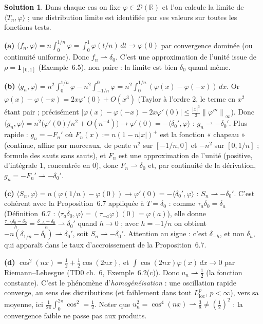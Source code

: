 \documentclass[11pt,a4paper]{article}
\newcommand{\R}{\mathbb{R}}
\newcommand{\norm}[1]{\left\|#1\right\|}
\newcommand{\wk}{\rightharpoonup}
\newcommand{\D}{\mathcal{D}}
\theoremstyle{definition}
\newtheorem*{solution}{Solution}
\begin{document}
\begin{solution}
Dans chaque cas on fixe $\varphi\in\D(\R)$ et l'on calcule la limite de $\langle T_n,\varphi\rangle$ ; une distribution limite est identifiée par ses valeurs sur toutes les fonctions tests.

\medskip
\noindent\textbf{(a)} $\langle f_n,\varphi\rangle=n\int_0^{1/n}\varphi=\int_0^1\varphi(t/n)\,dt\to\varphi(0)$ par convergence dominée (ou continuité uniforme). Donc $f_n\wk\delta_0$. C'est une approximation de l'unité issue de $\rho=\mathbf 1_{[0,1]}$ (Exemple~6.5), non paire : la limite est bien $\delta_0$ quand même.

\medskip
\noindent\textbf{(b)} $\langle g_n,\varphi\rangle=n^2\int_0^{1/n}\varphi-n^2\int_{-1/n}^0\varphi=n^2\int_0^{1/n}(\varphi(x)-\varphi(-x))\,dx$. Or $\varphi(x)-\varphi(-x)=2x\varphi'(0)+O(x^3)$ (Taylor à l'ordre $2$, le terme en $x^2$ étant pair ; précisément $|\varphi(x)-\varphi(-x)-2x\varphi'(0)|\le\frac{|x|^3}3\norm{\varphi'''}_\infty$). Donc $\langle g_n,\varphi\rangle=n^2\big(\varphi'(0)/n^2+O(n^{-4})\big)\to\varphi'(0)=-\langle\delta_0',\varphi\rangle$ : $g_n\wk-\delta_0'$. Plus rapide : $g_n=-F_n'$ où $F_n(x):=n(1-n|x|)^+$ est la fonction « chapeau » (continue, affine par morceaux, de pente $n^2$ sur $[-1/n,0]$ et $-n^2$ sur $[0,1/n]$ ; formule des sauts sans sauts), et $F_n$ est une approximation de l'unité (positive, d'intégrale $1$, concentrée en $0$), donc $F_n\wk\delta_0$ et, par continuité de la dérivation, $g_n=-F_n'\wk-\delta_0'$.

\medskip
\noindent\textbf{(c)} $\langle S_n,\varphi\rangle=n(\varphi(1/n)-\varphi(0))\to\varphi'(0)=-\langle\delta_0',\varphi\rangle$ : $S_n\wk-\delta_0'$. C'est cohérent avec la Proposition~6.7 appliquée à $T=\delta_0$ : comme $\tau_a\delta_0=\delta_a$ (Définition~6.7 : $\langle\tau_a\delta_0,\varphi\rangle=(\tau_{-a}\varphi)(0)=\varphi(a)$), elle donne $\frac{\tau_{-h}\delta_0-\delta_0}h=\frac{\delta_{-h}-\delta_0}h\wk\delta_0'$ quand $h\to0$ ; avec $h=-1/n$ on obtient $-n(\delta_{1/n}-\delta_0)\wk\delta_0'$, soit $S_n\wk-\delta_0'$. Attention au signe : c'est $\delta_{-h}$, et non $\delta_h$, qui apparaît dans le taux d'accroissement de la Proposition~6.7.

\medskip
\noindent\textbf{(d)} $\cos^2(nx)=\frac12+\frac12\cos(2nx)$, et $\int\cos(2nx)\varphi(x)\,dx\to0$ par Riemann--Lebesgue (TD0 ch.~6, Exemple~6.2(c)). Donc $u_n\wk\frac12$ (la fonction constante). C'est le phénomène d'\emph{homogénéisation} : une oscillation rapide converge, au sens des distributions (et faiblement dans tout $L^p_{\mathrm{loc}}$, $p<\infty$), vers sa moyenne, ici $\frac1{2\pi}\int_0^{2\pi}\cos^2=\frac12$. Noter que $u_n^2=\cos^4(nx)\wk\frac38\ne(\frac12)^2$ : la convergence faible ne passe pas aux produits.


\end{solution}
\end{document}
